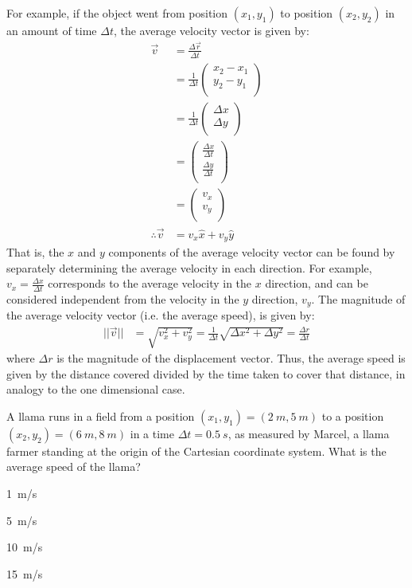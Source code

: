 For example, if the object went from position $(x_1,y_1)$ to position $(x_2,y_2)$ in an amount of time $\Delta t$, the average velocity vector is given by:
\begin{align*}
\vec v &= \frac{\Delta \vec r}{\Delta t}\\
&=\frac{1}{\Delta t}\begin{pmatrix}
           x_2-x_1 \\
           y_2-y_1 \\
         \end{pmatrix}\\
 &=\frac{1}{\Delta t}\begin{pmatrix}
           \Delta x \\
           \Delta y \\
         \end{pmatrix}\\     
 &=\begin{pmatrix}
           \frac{\Delta x}{\Delta t} \\
           \frac{\Delta y}{\Delta t}\\
         \end{pmatrix}\\       
 &=\begin{pmatrix}
           v_x \\
           v_y \\
         \end{pmatrix}\\    
\therefore \vec v &= v_x\hat x+v_y\hat y                     
\end{align*}
That is, the $x$ and $y$ components of the average velocity vector can be found by separately determining the average velocity in each direction. For example, $v_x=\frac{\Delta x}{\Delta t}$ corresponds to the average velocity in the $x$ direction, and can be considered independent from the velocity in the $y$ direction, $v_y$. The magnitude of the average velocity vector (i.e. the average speed), is given by:
\begin{align*}
||\vec v||&=\sqrt{v_x^2+v_y^2}=\frac{1}{\Delta t}\sqrt{\Delta x^2+\Delta y^2}=\frac{\Delta r}{\Delta t}
\end{align*}
where $\Delta r$ is the magnitude of the displacement vector. Thus, the average speed is given by the distance covered divided by the time taken to cover that distance, in analogy to the one dimensional case.

\begin{checkpoint}
\begin{MCquestion}{A llama runs in a field from a position $(x_1,y_1)=(\SI{2}{m},\SI{5}{m})$ to a position $(x_2,y_2)=(\SI{6}{m},\SI{8}{m})$ in a time $\Delta t=\SI{0.5}{s}$, as measured by Marcel, a llama farmer standing at the origin of the Cartesian coordinate system. What is the average speed of the llama?}
\item \SI{1}{m/s}
\item \SI{5}{m/s}
\item \SI{10}{m/s}%
\item \SI{15}{m/s}
\end{MCquestion}
\end{checkpoint}

